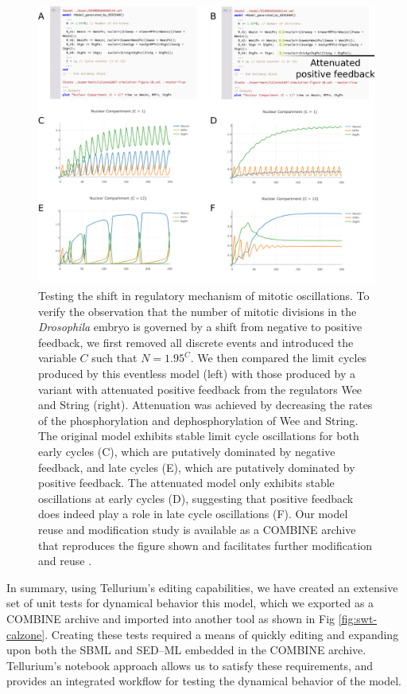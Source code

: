 \documentclass[10pt,letterpaper]{article}
\begin{document}
\begin{figure}
  \includegraphics[width=1.0\textwidth]{calzone-limit-cycles.pdf}
  \caption{Testing the shift in regulatory mechanism of mitotic oscillations. To verify the observation \cite{calzone2007dynamical} that the number of mitotic divisions in the \textit{Drosophila} embryo is governed by a shift from negative to positive feedback, we first removed all discrete events and introduced the variable $C$ such that $N=1.95^C$. We then compared the limit cycles produced by this eventless model (left) with those produced by a variant with attenuated positive feedback from the regulators Wee and String (right). Attenuation was achieved by decreasing the rates of the phosphorylation and dephosphorylation of Wee and String. The original model exhibits stable limit cycle oscillations for both early cycles (C), which are putatively dominated by negative feedback, and late cycles (E), which are putatively dominated by positive feedback. The attenuated model only exhibits stable oscillations at early cycles (D), suggesting that positive feedback does indeed play a role in late cycle oscillations (F). Our model reuse and modification study is available as a COMBINE archive that reproduces the figure shown and facilitates further modification and reuse \cite{calzone-feedback-archive}. }
  \label{fig:calzone-limit-cycles}
\end{figure}

In summary, using Tellurium's editing capabilities, we have created an extensive set of unit tests for dynamical behavior this model, which we exported as a COMBINE archive and imported into another tool as shown in Fig \ref{fig:swt-calzone}. Creating these tests required a means of quickly editing and expanding upon both the SBML and SED--ML embedded in the COMBINE archive. Tellurium's notebook approach allows us to satisfy these requirements, and provides an integrated workflow for testing the dynamical behavior of the model.
\end{document}
